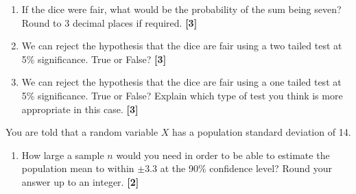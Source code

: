 \documentclass[a4paper, leqno, 12pt]{article} %
\newenvironment{top_enumerate}{
\begin{enumerate}
  \setlength{\itemsep}{2em}
  \setlength{\topsep}{-0pt}
  \setlength{\partopsep}{-0pt}
}{\end{enumerate}}
\begin{document}
\begin{top_enumerate}
\setcounter{equation}{0}  %
\begin{enumerate}
	\setlength{\topsep}{-0pt}
	\setlength{\partopsep}{-0pt}
	\setlength{\itemsep}{10pt}
			\item If the dice were fair, what would be the probability of the sum being seven? Round to 3 decimal places if required.
	 \quad \textbf{[3]}
		\item We can reject the hypothesis that the dice are fair using a two tailed test at 5\% significance. True or False?
	 \quad \textbf{[3]}
		\item We can reject the hypothesis that the dice are fair using a one tailed test at 5\% significance. True or False? Explain which type of test you think is more appropriate in this case.
	 \quad \textbf{[3]}
\end{enumerate}\item You are told that a random variable $X$ has a population standard deviation of {14}.
 
\setcounter{equation}{0}  %
\begin{enumerate}
	\setlength{\topsep}{-0pt}
	\setlength{\partopsep}{-0pt}
	\setlength{\itemsep}{10pt}
			\item How large a sample $n$ would you need in order to be able to estimate the population mean to within $\pm${3.3} at the {90}\% confidence level? Round your answer up to an integer.
	 \quad \textbf{[2]}
\end{enumerate}

\end{top_enumerate}

\bigskip
\section*{}
\end{document}

